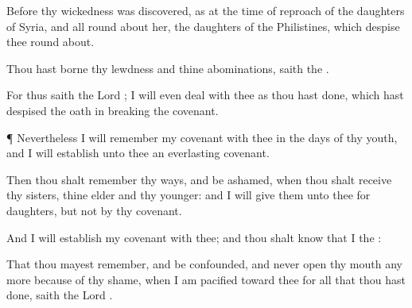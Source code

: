 {Before thy
wickedness was
discovered, as at the
time of
{}
reproach of the
daughters of
Syria, and all
{} round
about her, the
daughters of the
Philistines, which
despise thee round
about.

Thou hast
borne thy
lewdness and thine
abominations,
saith the
{}.

For thus
saith the
Lord
{}; I will even
deal with thee as thou hast
done, which hast
despised the
oath in
breaking the
covenant.


\par }{\PP {}¶ Nevertheless I will
remember my
covenant with thee in the
days of thy
youth, and I will
establish unto thee an
everlasting
covenant.

Then thou shalt
remember thy
ways, and be
ashamed, when thou shalt
receive thy
sisters, thine
elder and thy
younger: and I will
give them unto thee for
daughters, but not by thy
covenant.

And I will
establish my
covenant with thee; and thou shalt
know that I
{} the
{}:

That thou mayest
remember, and be
confounded, and never
open thy
mouth any more
because of thy
shame, when I am
pacified toward thee for all that thou hast
done,
saith the
Lord
{}.




\par }
